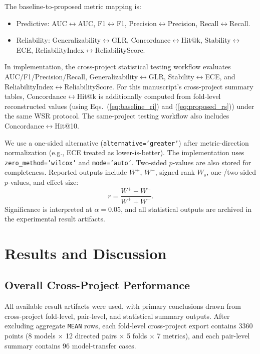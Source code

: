 \documentclass[conference]{IEEEtran}
\begin{document}
The baseline-to-proposed metric mapping is:
\begin{itemize}
\item Predictive: AUC\(\leftrightarrow\)AUC, F1\(\leftrightarrow\)F1, Precision\(\leftrightarrow\)Precision, Recall\(\leftrightarrow\)Recall.
\item Reliability: Generalizability\(\leftrightarrow\)GLR, Concordance\(\leftrightarrow\)Hit@k, Stability\(\leftrightarrow\)ECE, ReliabilityIndex\(\leftrightarrow\)ReliabilityScore.
\end{itemize}

In implementation, the cross-project statistical testing workflow evaluates AUC/F1/Precision/Recall, Generalizability\(\leftrightarrow\)GLR, Stability\(\leftrightarrow\)ECE, and ReliabilityIndex\(\leftrightarrow\)ReliabilityScore. For this manuscript's cross-project summary tables, Concordance\(\leftrightarrow\)Hit@k is additionally computed from fold-level reconstructed values (using Eqs.~(\ref{eq:baseline_ri}) and (\ref{eq:proposed_rs})) under the same WSR protocol. The same-project testing workflow also includes Concordance\(\leftrightarrow\)Hit@10.

We use a one-sided alternative (\texttt{alternative='greater'}) after metric-direction normalization (e.g., ECE treated as lower-is-better). The implementation uses \texttt{zero\_method='wilcox'} and \texttt{mode='auto'}. Two-sided \(p\)-values are also stored for completeness. Reported outputs include \(W^{+}\), \(W^{-}\), signed rank \(W_s\), one-/two-sided \(p\)-values, and effect size:
\begin{equation}
r=\frac{W^{+}-W^{-}}{W^{+}+W^{-}}.
\end{equation}
Significance is interpreted at \(\alpha=0.05\), and all statistical outputs are archived in the experimental result artifacts.

\section{Results and Discussion}
\subsection{Overall Cross-Project Performance}
All available result artifacts were used, with primary conclusions drawn from cross-project fold-level, pair-level, and statistical summary outputs. After excluding aggregate \texttt{MEAN} rows, each fold-level cross-project export contains 3360 points (8 models \(\times\) 12 directed pairs \(\times\) 5 folds \(\times\) 7 metrics), and each pair-level summary contains 96 model-transfer cases.
\end{document}

